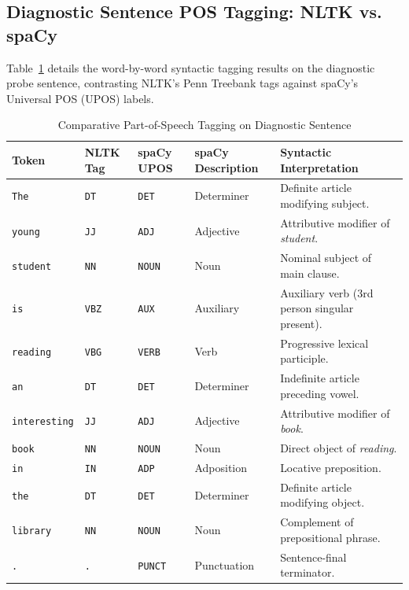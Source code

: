 \subsection{Diagnostic Sentence POS Tagging: NLTK vs. spaCy}
Table~\ref{tab:exp5_pos_sent_compare} details the word-by-word syntactic tagging results on the diagnostic probe sentence, contrasting NLTK's Penn Treebank tags against spaCy's Universal POS (UPOS) labels.
\begin{table}[H]
\centering
\small
\caption{Comparative Part-of-Speech Tagging on Diagnostic Sentence}
\label{tab:exp5_pos_sent_compare}
\begin{tabularx}{\textwidth}{lllp{4cm}X}
\toprule
\textbf{Token} & \textbf{NLTK Tag} & \textbf{spaCy UPOS} & \textbf{spaCy Description} & \textbf{Syntactic Interpretation} \\
\midrule
\texttt{The} & \texttt{DT} & \texttt{DET} & Determiner & Definite article modifying subject. \\
\texttt{young} & \texttt{JJ} & \texttt{ADJ} & Adjective & Attributive modifier of \textit{student}. \\
\texttt{student} & \texttt{NN} & \texttt{NOUN} & Noun & Nominal subject of main clause. \\
\texttt{is} & \texttt{VBZ} & \texttt{AUX} & Auxiliary & Auxiliary verb (3rd person singular present). \\
\texttt{reading} & \texttt{VBG} & \texttt{VERB} & Verb & Progressive lexical participle. \\
\texttt{an} & \texttt{DT} & \texttt{DET} & Determiner & Indefinite article preceding vowel. \\
\texttt{interesting} & \texttt{JJ} & \texttt{ADJ} & Adjective & Attributive modifier of \textit{book}. \\
\texttt{book} & \texttt{NN} & \texttt{NOUN} & Noun & Direct object of \textit{reading}. \\
\texttt{in} & \texttt{IN} & \texttt{ADP} & Adposition & Locative preposition. \\
\texttt{the} & \texttt{DT} & \texttt{DET} & Determiner & Definite article modifying object. \\
\texttt{library} & \texttt{NN} & \texttt{NOUN} & Noun & Complement of prepositional phrase. \\
\texttt{.} & \texttt{.} & \texttt{PUNCT} & Punctuation & Sentence-final terminator. \\
\bottomrule
\end{tabularx}
\end{table}

